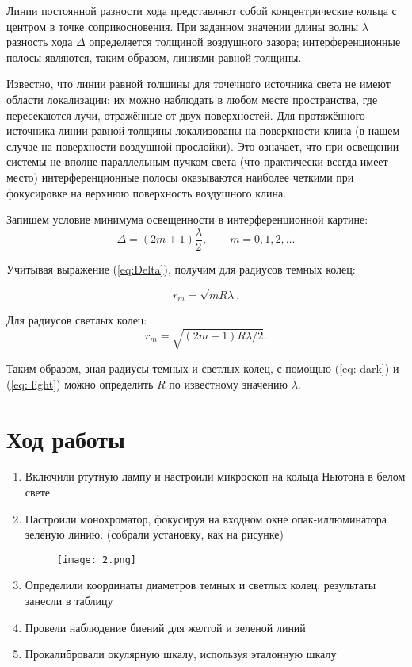 \documentclass{letask}
\begin{document}
Линии постоянной разности хода представляют собой концентрические кольца с центром в точке соприкосновения. При заданном значении длины волны $\lambda$ разность хода $\Delta$ определяется толщиной воздушного зазора; интерференционные полосы являются, таким образом, линиями равной толщины.

Известно, что линии равной толщины для точечного источника света не имеют области локализации: их можно наблюдать в любом месте пространства, где пересекаются лучи, отражённые от двух поверхностей. Для протяжённого источника линии равной толщины локализованы на поверхности клина (в нашем случае на поверхности воздушной прослойки). Это означает, что при освещении системы не вполне параллельным пучком света (что практически всегда имеет место) интерференционные полосы оказываются наиболее четкими при фокусировке на верхнюю поверхность воздушного клина.

Запишем условие минимума освещенности в интерференционной картине:
\[ \Delta = (2m + 1)\dfrac{\lambda}{2}, \qquad m = 0, 1, 2, \ldots\]

Учитывая выражение (\ref{eq:Delta}), получим для радиусов темных колец:

\begin{equation}
\label{eq: dark}
r_m = \sqrt{mR \lambda} .
\end{equation} 

Для радиусов светлых колец:
\begin{equation}
\label{eq: light}
r_m = \sqrt{(2m-1)R\lambda / 2}.
\end{equation}

Таким образом, зная радиусы темных и светлых колец, с помощью (\ref{eq: dark}) и (\ref{eq: light}) можно определить $R$ по известному значению $\lambda$.

\section{Ход работы}
\begin{enumerate}
	\item Включили ртутную лампу и настроили микроскоп на кольца Ньютона в белом свете
	\item Настроили монохроматор, фокусируя на входном окне опак-иллюминатора зеленую линию. (собрали установку, как на рисунке)
	\begin{figure}[H]
		\centering
		\texttt{[image: 2.png]}
	\end{figure}
	\item Определили координаты диаметров темных и светлых колец, результаты занесли в таблицу
	\item Провели наблюдение биений для желтой и зеленой линий 
	\item Прокалибровали окулярную шкалу, используя эталонную шкалу
\end{enumerate}
\end{document}
